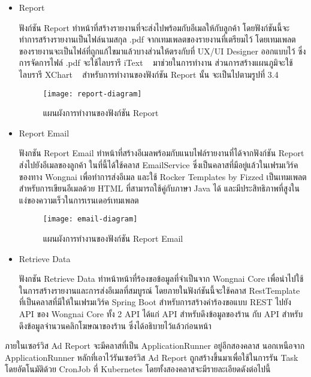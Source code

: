 \begin{enumerate}
\begin{itemize}
		\item Report
		
		ฟังก์ชัน Report ทำหน้าที่สร้างรายงานที่จะส่งไปพร้อมกับอีเมลให้กับลูกค้า โดยฟังก์ชันนี้จะทำการสร้างรายงานเป็นไฟล์นามสกุล .pdf จากเทมเพลตของรายงานที่เตรียมไว้ โดยเทมเพลตของรายงานจะเป็นไฟล์ที่ถูกแก้ไขมาแล้วบางส่วนให้ตรงกับที่ UX/UI Designer ออกแบบไว้ ซึ่งการจัดการไฟล์ .pdf จะใช้ไลบรารี iText ~\cite{itext} มาช่วยในการทำงาน ส่วนการสร้างแผนภูมิจะใช้ไลบรารี XChart  ~\cite{xchart} สำหรับการทำงานของฟังก์ชัน Report นั้น จะเป็นไปตามรูปที่ 3.4
		
		\begin{figure}[!h]
			\centering
			\texttt{[image: report-diagram]}  
			\caption{แผนผังการทำงานของฟังก์ชัน Report}
			\label{Fig:report-diagram}
		\end{figure}
		
		\item Report Email
		
		ฟังกชัน Report Email ทำหน้าที่สร้างอีเมลพร้อมกับแนบไฟล์รายงานที่ได้จากฟังก์ชัน Report ส่งไปยังอีเมลของลูกค้า ในที่นี้ได้ใช้คลาส EmailService ซึ่งเป็นคลาสที่มีอยู่แล้วในเฟรมเวิร์คของทาง Wongnai เพื่อทำการส่งอีเมล และใช้ Rocker Templates by Fizzed เป็นเทมเพลตสำหรับการเขียนอีเมลด้วย HTML ที่สามารถใช้คู่กับภาษา Java ได้ และมีประสิทธิภาพที่สูงในแง่ของความเร็วในการเรนเดอร์เทมเพลต ~\cite{rocker}
			
		\begin{figure}[!h]
			\centering
			\texttt{[image: email-diagram]}  
			\caption{แผนผังการทำงานของฟังก์ชัน Report Email}
			\label{Fig:email-diagram}
		\end{figure}
			
		\item Retrieve Data
		
		ฟังกชัน Retrieve Data ทำหน้าหน้าที่ร้องขอข้อมูลที่จำเป็นจาก Wongnai Core เพื่อนำไปใช้ในการสร้างรายงานและการส่งอีเมลที่สมบูรณ์ โดยภายในฟังก์ชันนี้จะใช้คลาส RestTemplate ที่เป็นคลาสที่มีให้ในเฟรมเวิร์ค Spring Boot สำหรับการสร้างคำร้องขอแบบ REST ไปยัง API ของ Wongnai Core ทั้ง 2 API ได้แก่ API สำหรับดึงข้อมูลของร้าน กับ API สำหรับดึงข้อมูลจำนวนคลิกโฆษณาของร้าน ซึ่งได้อธิบายไว้แล้วก่อนหน้า
	\end{itemize}

	ภายในเซอร์วิส Ad Report จะมีคลาสที่เป็น ApplicationRunner อยู่อีกสองคลาส นอกเหนือจาก ApplicationRunner หลักที่เอาไว้รันเซอร์วิส Ad Report ถูกสร้างขึ้นมาเพื่อใช้ในการรัน Task โดยอัตโนมัติด้วย CronJob ที่ Kubernetes โดยทั้งสองคลาสจะมีรายละเอียดดังต่อไปนี้


\end{enumerate}
